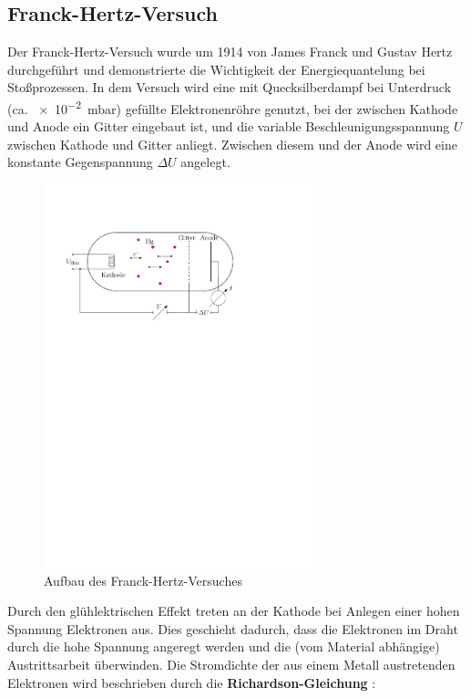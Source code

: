 \documentclass[11pt, a4paper]{article}
\begin{document}
\subsection{Franck-Hertz-Versuch}

Der Franck-Hertz-Versuch wurde um 1914 von James Franck und Gustav Hertz \cite{demtroeder3} durchgeführt und demonstrierte die Wichtigkeit der Energiequantelung bei Stoßprozessen.
In dem Versuch wird eine mit Quecksilberdampf bei Unterdruck (ca. \SI{e-2}{\milli\bar}) gefüllte Elektronenröhre genutzt, bei der zwischen Kathode und Anode ein Gitter eingebaut ist, und die variable Beschleunigungsspannung $U$ zwischen Kathode und Gitter anliegt.
Zwischen diesem und der Anode wird eine konstante Gegenspannung $\Delta U$ angelegt.
\begin{figure}[h]
\centering
\includegraphics[width=0.7\textwidth]{./figures/franck-hertz_aufbau.pdf}
\caption{Aufbau des Franck-Hertz-Versuches}
\label{fig:franck-hertz_aufbau}
\end{figure}
Durch den glühlektrischen Effekt treten an der Kathode bei Anlegen einer hohen Spannung Elektronen aus.
Dies geschieht dadurch, dass die Elektronen im Draht durch die hohe Spannung angeregt werden und die (vom Material abhängige) Austrittsarbeit überwinden.
Die Stromdichte der aus einem Metall austretenden Elektronen wird beschrieben durch die \textbf{Richardson-Gleichung} \cite{np_richardson}:
\end{document}
